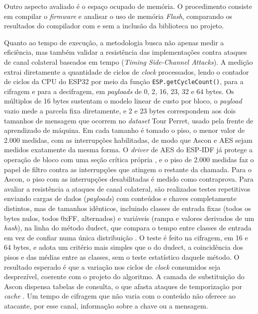 Outro aspecto avaliado é o espaço ocupado de memória. O procedimento consiste em compilar o \textit{firmware} e analisar o uso de memória \textit{Flash}, comparando os resultados do compilador com e sem a inclusão da biblioteca no projeto.

Quanto ao tempo de execução, a metodologia busca não apenas medir a eficiência, mas também validar a resistência das implementações contra ataques de canal colateral baseados em tempo (\textit{Timing Side-Channel Attacks}). A medição extrai diretamente a quantidade de ciclos de \textit{clock} processados, lendo o contador de ciclos da CPU do ESP32 por meio da função \texttt{ESP.getCycleCount()}, para a cifragem e para a decifragem, em \textit{payloads} de 0, 2, 16, 23, 32 e 64 bytes. Os múltiplos de 16 bytes sustentam o modelo linear de custo por bloco, o \textit{payload} vazio mede a parcela fixa diretamente, e 2 e 23 bytes correspondem aos dois tamanhos de mensagem que ocorrem no \textit{dataset} Tour Perret, usado pela frente de aprendizado de máquina. Em cada tamanho é tomado o piso, o menor valor de 2.000 medidas, com as interrupções habilitadas, de modo que Ascon e AES sejam medidos exatamente da mesma forma. O \textit{driver} de AES do ESP-IDF já protege a operação de bloco com uma seção crítica própria \cite{espressif2026idf}, e o piso de 2.000 medidas faz o papel de filtro contra as interrupções que atingem o restante da chamada. Para o Ascon, o piso com as interrupções desabilitadas é medido como contraprova. Para avaliar a resistência a ataques de canal colateral, são realizados testes repetitivos enviando cargas de dados (\textit{payloads}) com conteúdos e chaves completamente distintos, mas de tamanhos idênticos, incluindo classes de entrada fixas (todos os bytes nulos, todos 0xFF, alternados) e variáveis (rampa e valores derivados de um \textit{hash}), na linha do método dudect, que compara o tempo entre classes de entrada em vez de confiar numa única distribuição \cite{reparaz2017dudect}. O teste é feito na cifragem, em 16 e 64 bytes, e adota um critério mais simples que o do dudect, a coincidência dos pisos e das médias entre as classes, sem o teste estatístico daquele método. O resultado esperado é que a variação nos ciclos de \textit{clock} consumidos seja desprezível, coerente com o projeto do algoritmo. A camada de substituição do Ascon dispensa tabelas de consulta, o que afasta ataques de temporização por \textit{cache} \cite{ascon_v12_spec}. Um tempo de cifragem que não varia com o conteúdo não oferece ao atacante, por esse canal, informação sobre a chave ou a mensagem.


